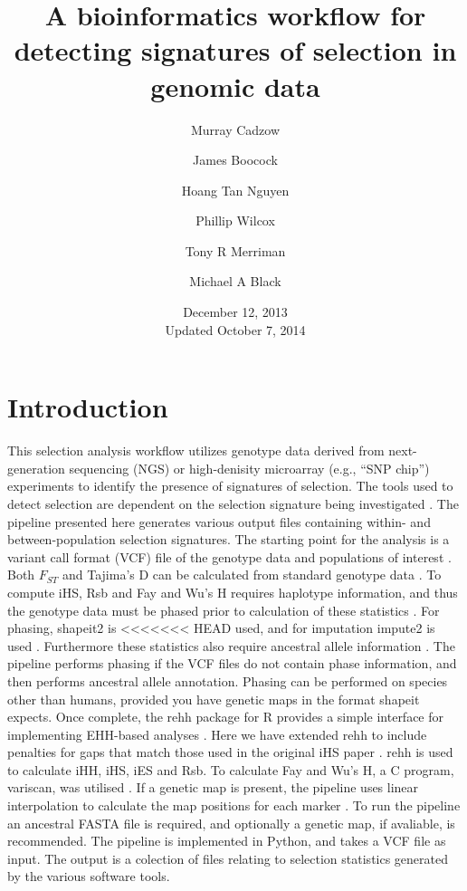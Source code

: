 \documentclass[a4paper,10pt]{article}
\title{\textbf{A bioinformatics workflow for detecting signatures of selection in genomic data}}
\date{December 12, 2013\\ Updated October 7, 2014}
\author[1]{Murray Cadzow}
\author[1]{James Boocock}
\author[1,2]{Hoang Tan Nguyen}
\author[1,3]{Phillip Wilcox}
\author[1]{Tony R Merriman}
\author[1]{Michael A Black}
\affil[1]{Department of Biochemistry, University of Otago}
\affil[2]{Department of Mathematics and Statistics, University of Otago}
\affil[3]{Scion Research, Rotorua, New Zealand}
\begin{document}
\maketitle{}\textmd{}
\tableofcontents

\pagebreak
\section{Introduction}

This selection analysis workflow utilizes genotype data derived from
next-generation sequencing (NGS) or high-denisity microarray (e.g.,
``SNP chip'') experiments to identify the presence of signatures of
selection. The tools used to detect selection are dependent on the
selection signature being investigated \citep{Sabeti:2006ha}. The
pipeline presented here generates various output files containing
within- and between-population selection signatures. The starting
point for the analysis
is a variant call format (VCF) file of the genotype data and
populations of interest \citep{Danecek:2011gz}. Both $F_{ST}$ and
Tajima's D can be calculated from standard genotype data
\citep{Weir:1984vn, Tajima:1989un}. To compute iHS, Rsb and Fay
and Wu's H requires haplotype information, and thus the genotype data must be
phased prior to calculation of these statistics \citep{Voight:2006go,
  Gautier:2012et,fayandwush}. For phasing, shapeit2 is
<<<<<<< HEAD
used, and for imputation impute2 is used \citep{impute22009,
  Delaneau:2013hi}. Furthermore these statistics also require
ancestral allele information \citep{Flicek:2012vg}.  The pipeline
performs phasing if the VCF files do not contain phase information, and
then performs ancestral allele annotation. Phasing can be performed on species other than humans, provided you have genetic maps in the format shapeit expects. 
Once complete, the rehh
package for R provides a simple interface for implementing EHH-based
analyses \citep{Gautier:2012et}. Here we have extended rehh to include penalties
for gaps that match those used in the original iHS paper
\citep{Voight:2006go}. rehh is used to calculate iHH, iHS, iES and Rsb. To
calculate Fay and Wu's H, a C program, variscan, was utilised
\citep{variscan2005}. If a genetic map is present, the pipeline uses linear interpolation to calculate the map positions for each
marker \citep{Nievergelt:2004ci}. To run the pipeline an ancestral FASTA file is required, and optionally a genetic map, if avaliable, is recommended. 
The pipeline is implemented in Python, and takes a VCF
file as input. The output is a colection of files relating to selection
statistics generated by the various software tools.
\end{document}
